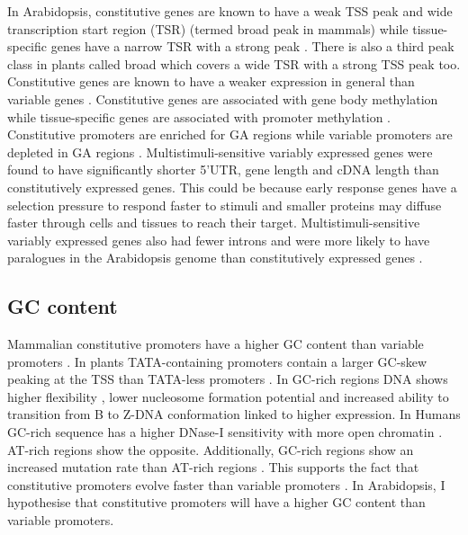\documentclass[../main.tex]{subfiles}
\begin{document}
In Arabidopsis, constitutive genes are known to have a weak TSS peak and wide transcription start region (TSR) (termed broad peak in mammals) while tissue-specific genes have a narrow TSR with a strong peak \autocite{mortonPairedEndAnalysisTranscription2014}.
There is also a third peak class in plants called broad which covers a wide TSR with a strong TSS peak too.
Constitutive genes are known to have a weaker expression in general than variable genes \autocite{czechowskiGenomeWideIdentificationTesting2005,mortonPairedEndAnalysisTranscription2014}.
Constitutive genes are associated with gene body methylation \autocite{zhangGenomewideHighResolutionMapping2006, takunoBodyMethylatedGenesArabidopsis2012,aceitunoRulesGeneExpression2008} while tissue-specific genes are associated with promoter methylation \autocite{zhangGenomewideHighResolutionMapping2006}.
Constitutive promoters are enriched for GA regions while variable promoters are depleted in GA regions \autocite{yamamotoHeterogeneityArabidopsisCore2009}. 
Multistimuli\hyp{}sensitive variably expressed genes were found to have significantly shorter 5'UTR, gene length and cDNA length than constitutively expressed genes.
This could be because early response genes have a selection pressure to respond faster to stimuli and smaller proteins may diffuse faster through cells and tissues to reach their target.
Multistimuli\hyp{}sensitive variably expressed genes also had fewer introns and were more likely to have paralogues in the Arabidopsis genome than constitutively expressed genes \autocite{waltherRegulatoryCodeTranscriptional2007}.

\subsection{GC content}
\label{chapter1:introduction:gc-content}

Mammalian constitutive promoters have a higher GC content than variable promoters \autocite{vinogradovDNAHelixImportance2017,weiCharacterizationGenePromoters2019}.
In plants TATA-containing promoters contain a larger GC-skew peaking at the TSS than TATA-less promoters \autocite{zuoIdentificationTATATATAless2011}.
In GC-rich regions DNA shows higher flexibility \autocite{vinogradovBendableGenesWarmblooded2001,vinogradovDNAHelixImportance2003}, lower nucleosome formation potential \autocite{vinogradovNoncodingDNAIsochores2005} and increased ability to transition from B to Z-DNA conformation \autocite{vinogradovDNAHelixImportance2003} linked to higher expression.
In Humans GC-rich sequence has a higher DNase-I sensitivity with more open chromatin \autocite{difilippoMappingDNaseIHypersensitive2008}.
AT-rich regions show the opposite.
Additionally, GC-rich regions show an increased mutation rate than AT-rich regions \autocite{vinogradovDNAHelixImportance2017}.
This supports the fact that constitutive promoters evolve faster than variable promoters \autocite{farreHousekeepingGenesTend2007,carninciGenomewideAnalysisMammalian2006}.
In Arabidopsis, I hypothesise that constitutive promoters will have a higher GC content than variable promoters.
\end{document}
